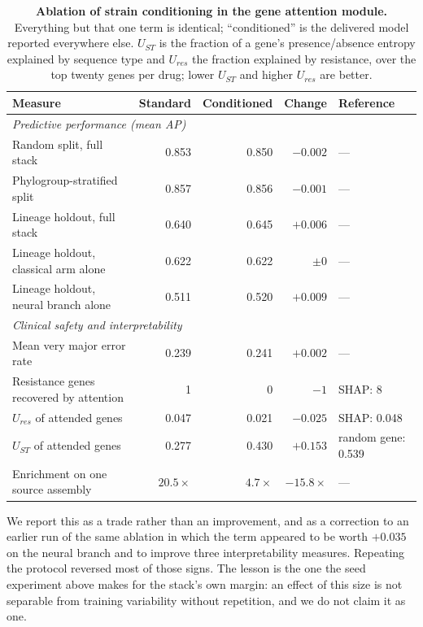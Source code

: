 \begin{table}[t]\centering\small
\caption{\textbf{Ablation of strain conditioning in the gene attention module.} Everything but that
one term is identical; ``conditioned'' is the delivered model reported everywhere else. $U_{ST}$ is
the fraction of a gene's presence/absence entropy explained by sequence type and $U_{res}$ the
fraction explained by resistance, over the top twenty genes per drug; lower $U_{ST}$ and higher
$U_{res}$ are better.}
\label{tab:attnfix}
\begin{tabular}{lrrrl}
\toprule
Measure & Standard & Conditioned & Change & Reference \\
\midrule
\multicolumn{5}{l}{\textit{Predictive performance (mean AP)}} \\
Random split, full stack & 0.853 & 0.850 & $-0.002$ & --- \\
Phylogroup-stratified split & 0.857 & 0.856 & $-0.001$ & --- \\
Lineage holdout, full stack & 0.640 & 0.645 & $+0.006$ & --- \\
Lineage holdout, classical arm alone & 0.622 & 0.622 & $\pm 0$ & --- \\
Lineage holdout, neural branch alone & 0.511 & 0.520 & $+0.009$ & --- \\
\midrule
\multicolumn{5}{l}{\textit{Clinical safety and interpretability}} \\
Mean very major error rate & 0.239 & 0.241 & $+0.002$ & --- \\
Resistance genes recovered by attention & 1 & 0 & $-1$ & SHAP: 8 \\
$U_{res}$ of attended genes & 0.047 & 0.021 & $-0.025$ & SHAP: 0.048 \\
$U_{ST}$ of attended genes & 0.277 & 0.430 & $+0.153$ & random gene: 0.539 \\
Enrichment on one source assembly & $20.5\times$ & $4.7\times$ & $-15.8\times$ & --- \\
\bottomrule
\end{tabular}
\end{table}

We report this as a trade rather than an improvement, and as a correction to an earlier run of the
same ablation in which the term appeared to be worth $+0.035$ on the neural branch and to improve
three interpretability measures. Repeating the protocol reversed most of those signs. The lesson
is the one the seed experiment above makes for the stack's own margin: an effect of this size is not
separable from training variability without repetition, and we do not claim it as one.

